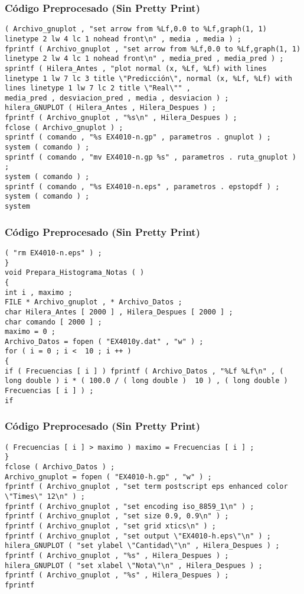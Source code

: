 \documentclass{beamer}
\begin{document}
\begin{frame}[fragile]
\frametitle{C\'odigo Preprocesado (Sin Pretty Print)}
\begin{lstlisting}[style=CStyle]
( Archivo_gnuplot , "set arrow from %Lf,0.0 to %Lf,graph(1, 1) linetype 2 lw 4 lc 1 nohead front\n" , media , media ) ; 
fprintf ( Archivo_gnuplot , "set arrow from %Lf,0.0 to %Lf,graph(1, 1) linetype 2 lw 4 lc 1 nohead front\n" , media_pred , media_pred ) ; 
sprintf ( Hilera_Antes , "plot normal (x, %Lf, %Lf) with lines linetype 1 lw 7 lc 3 title \"Predicción\", normal (x, %Lf, %Lf) with lines linetype 1 lw 7 lc 2 title \"Real\"" , 
media_pred , desviacion_pred , media , desviacion ) ; 
hilera_GNUPLOT ( Hilera_Antes , Hilera_Despues ) ; 
fprintf ( Archivo_gnuplot , "%s\n" , Hilera_Despues ) ; 
fclose ( Archivo_gnuplot ) ; 
sprintf ( comando , "%s EX4010-n.gp" , parametros . gnuplot ) ; 
system ( comando ) ; 
sprintf ( comando , "mv EX4010-n.gp %s" , parametros . ruta_gnuplot ) ; 
system ( comando ) ; 
sprintf ( comando , "%s EX4010-n.eps" , parametros . epstopdf ) ; 
system ( comando ) ; 
system \end{lstlisting}
\end{frame}
\begin{frame}[fragile]
\frametitle{C\'odigo Preprocesado (Sin Pretty Print)}
\begin{lstlisting}[style=CStyle]
( "rm EX4010-n.eps" ) ; 
} 
void Prepara_Histograma_Notas ( ) 
{ 
int i , maximo ; 
FILE * Archivo_gnuplot , * Archivo_Datos ; 
char Hilera_Antes [ 2000 ] , Hilera_Despues [ 2000 ] ; 
char comando [ 2000 ] ; 
maximo = 0 ; 
Archivo_Datos = fopen ( "EX4010y.dat" , "w" ) ; 
for ( i = 0 ; i <  10 ; i ++ ) 
{ 
if ( Frecuencias [ i ] ) fprintf ( Archivo_Datos , "%Lf %Lf\n" , ( long double ) i * ( 100.0 / ( long double )  10 ) , ( long double ) Frecuencias [ i ] ) ; 
if \end{lstlisting}
\end{frame}
\begin{frame}[fragile]
\frametitle{C\'odigo Preprocesado (Sin Pretty Print)}
\begin{lstlisting}[style=CStyle]
( Frecuencias [ i ] > maximo ) maximo = Frecuencias [ i ] ; 
} 
fclose ( Archivo_Datos ) ; 
Archivo_gnuplot = fopen ( "EX4010-h.gp" , "w" ) ; 
fprintf ( Archivo_gnuplot , "set term postscript eps enhanced color \"Times\" 12\n" ) ; 
fprintf ( Archivo_gnuplot , "set encoding iso_8859_1\n" ) ; 
fprintf ( Archivo_gnuplot , "set size 0.9, 0.9\n" ) ; 
fprintf ( Archivo_gnuplot , "set grid xtics\n" ) ; 
fprintf ( Archivo_gnuplot , "set output \"EX4010-h.eps\"\n" ) ; 
hilera_GNUPLOT ( "set ylabel \"Cantidad\"\n" , Hilera_Despues ) ; 
fprintf ( Archivo_gnuplot , "%s" , Hilera_Despues ) ; 
hilera_GNUPLOT ( "set xlabel \"Nota\"\n" , Hilera_Despues ) ; 
fprintf ( Archivo_gnuplot , "%s" , Hilera_Despues ) ; 
fprintf \end{lstlisting}
\end{frame}
\end{document}
